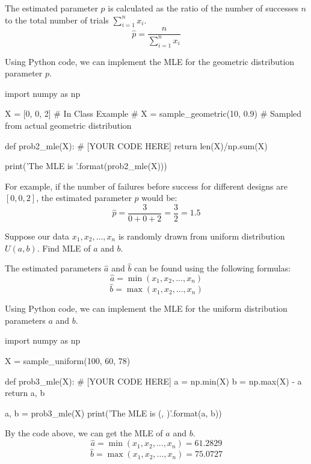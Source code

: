 \documentclass[a4paper, 10pt]{article}
\begin{document}
\begin{solution}
The estimated parameter \( p \) is calculated as the ratio of the number of successes \( n \) to the total number of trials \( \sum_{i=1}^{n} x_i \).
\[
    \hat{p} = \frac{n}{\sum_{i=1}^{n} x_i}
\] 

Using Python code, we can implement the MLE for the geometric distribution parameter \( p \).
\begin{codingbox}
import numpy as np

X = [0, 0, 2] # In Class Example
# X = sample_geometric(10, 0.9)   # Sampled from actual geometric distribution

def prob2_mle(X):
  # [YOUR CODE HERE]
  return len(X)/np.sum(X)

print('The MLE is {}'.format(prob2_mle(X)))
\end{codingbox}

For example, if the number of failures before success for different designs are \( [0, 0, 2] \), the estimated parameter \( p \) would be:
\[
    \hat{p} = \frac{3}{0 + 0 + 2} = \frac{3}{2} = 1.5
\]
\end{solution}

\newpage

\begin{problem}
Suppose our data \( x_1, x_2, ..., x_n \) is randomly drawn from uniform distribution \( U(a,b) \). Find MLE of \( a \) and \( b \).
\end{problem}

\begin{solution}
The estimated parameters \( \hat{a} \) and \( \hat{b} \) can be found using the following formulas:
\[
    \hat{a} = \min(x_1, x_2, ..., x_n)
\]
\[
    \hat{b} = \max(x_1, x_2, ..., x_n)
\]

Using Python code, we can implement the MLE for the uniform distribution parameters \( a \) and \( b \).
\begin{codingbox}
import numpy as np

X = sample_uniform(100, 60, 78)

def prob3_mle(X):
  # [YOUR CODE HERE]
  a = np.min(X)
  b = np.max(X) - a
  return a, b

a, b = prob3_mle(X)
print('The MLE is ({}, {})'.format(a, b))
\end{codingbox}

By the code above, we can get the MLE of \( a \) and \( b \).
\[
    \hat{a} = \min(x_1, x_2, ..., x_n) = 61.2829
\]
\[
    \hat{b} = \max(x_1, x_2, ..., x_n) = 75.0727
\]
\end{solution}
\end{document}
